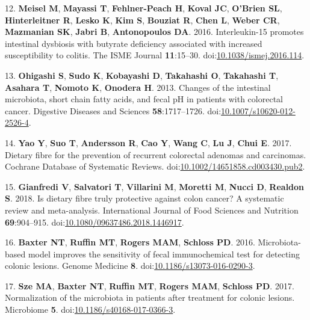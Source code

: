 \documentclass[11pt,]{article}
\begin{document}
\leavevmode\hypertarget{ref-Meisel2016}{}%
12. \textbf{Meisel M}, \textbf{Mayassi T}, \textbf{Fehlner-Peach H},
\textbf{Koval JC}, \textbf{O'Brien SL}, \textbf{Hinterleitner R},
\textbf{Lesko K}, \textbf{Kim S}, \textbf{Bouziat R}, \textbf{Chen L},
\textbf{Weber CR}, \textbf{Mazmanian SK}, \textbf{Jabri B},
\textbf{Antonopoulos DA}. 2016. Interleukin-15 promotes intestinal
dysbiosis with butyrate deficiency associated with increased
susceptibility to colitis. The ISME Journal \textbf{11}:15--30.
doi:\href{https://doi.org/10.1038/ismej.2016.114}{10.1038/ismej.2016.114}.

\leavevmode\hypertarget{ref-Ohigashi2013}{}%
13. \textbf{Ohigashi S}, \textbf{Sudo K}, \textbf{Kobayashi D},
\textbf{Takahashi O}, \textbf{Takahashi T}, \textbf{Asahara T},
\textbf{Nomoto K}, \textbf{Onodera H}. 2013. Changes of the intestinal
microbiota, short chain fatty acids, and fecal pH in patients with
colorectal cancer. Digestive Diseases and Sciences
\textbf{58}:1717--1726.
doi:\href{https://doi.org/10.1007/s10620-012-2526-4}{10.1007/s10620-012-2526-4}.

\leavevmode\hypertarget{ref-Yao2017}{}%
14. \textbf{Yao Y}, \textbf{Suo T}, \textbf{Andersson R}, \textbf{Cao
Y}, \textbf{Wang C}, \textbf{Lu J}, \textbf{Chui E}. 2017. Dietary fibre
for the prevention of recurrent colorectal adenomas and carcinomas.
Cochrane Database of Systematic Reviews.
doi:\href{https://doi.org/10.1002/14651858.cd003430.pub2}{10.1002/14651858.cd003430.pub2}.

\leavevmode\hypertarget{ref-Gianfredi2018}{}%
15. \textbf{Gianfredi V}, \textbf{Salvatori T}, \textbf{Villarini M},
\textbf{Moretti M}, \textbf{Nucci D}, \textbf{Realdon S}. 2018. Is
dietary fibre truly protective against colon cancer? A systematic review
and meta-analysis. International Journal of Food Sciences and Nutrition
\textbf{69}:904--915.
doi:\href{https://doi.org/10.1080/09637486.2018.1446917}{10.1080/09637486.2018.1446917}.

\leavevmode\hypertarget{ref-Baxter2016}{}%
16. \textbf{Baxter NT}, \textbf{Ruffin MT}, \textbf{Rogers MAM},
\textbf{Schloss PD}. 2016. Microbiota-based model improves the
sensitivity of fecal immunochemical test for detecting colonic lesions.
Genome Medicine \textbf{8}.
doi:\href{https://doi.org/10.1186/s13073-016-0290-3}{10.1186/s13073-016-0290-3}.

\leavevmode\hypertarget{ref-Sze2017}{}%
17. \textbf{Sze MA}, \textbf{Baxter NT}, \textbf{Ruffin MT},
\textbf{Rogers MAM}, \textbf{Schloss PD}. 2017. Normalization of the
microbiota in patients after treatment for colonic lesions. Microbiome
\textbf{5}.
doi:\href{https://doi.org/10.1186/s40168-017-0366-3}{10.1186/s40168-017-0366-3}.
\end{document}
